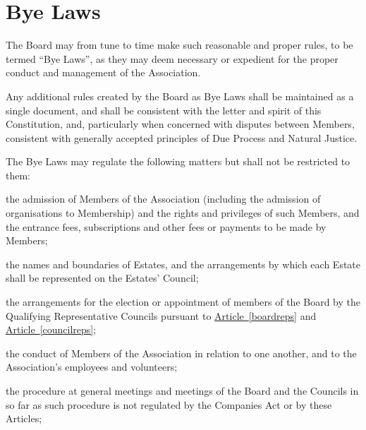 \documentclass[12pt]{article}
\newcommand{\EC}[0]{Board}
\newcommand{\Exec}[0]{\EC{} }
\newcommand{\articleref}[1]{\hyperref[#1]{Article~\ref*{#1}}}
\begin{document}

\section{Bye Laws}

\begin{constenum}

\item The \Exec may from tune to time make such reasonable and proper
  rules, to be termed ``Bye Laws'', as they may deem necessary or
  expedient for the proper conduct and management of the Association.

\item Any additional rules created by the \Exec as Bye Laws
  shall be maintained as a single document, and shall be
  consistent with the letter and spirit of this Constitution, and,
  particularly when concerned with disputes between Members,
  consistent with generally accepted principles of Due Process and
  Natural Justice.

\item The Bye Laws may regulate the following matters but shall not be
  restricted to them:

\begin{constenum}

\item the admission of Members of the Association (including the admission
  of organisations to Membership) and the rights and privileges of
  such Members, and the entrance fees, subscriptions and other fees or
  payments to be made by Members;

\item the names and boundaries of Estates, and the arrangements by which each
  Estate shall be represented on the Estates' Council;

\item the arrangements for the election or appointment of members of
  the \Exec by the Qualifying Representative Councils pursuant to
  \articleref{boardreps} and \articleref{councilreps};

\item the conduct of Members of the Association in relation to one
  another, and to the Association's employees and volunteers;

\item the procedure at general meetings and meetings of the \Exec and
  the Councils in so far as such procedure is not regulated by the
  Companies Act or by these Articles;


\end{constenum}
\end{constenum}
\end{document}
